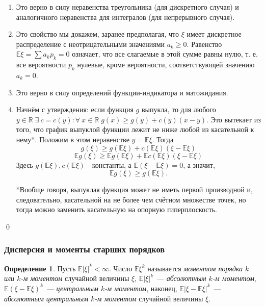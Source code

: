 \documentclass[oneside,final,14pt]{extreport}
\renewenvironment{proof}{{\bfseries Доказательство.}}{\qed}
\theoremstyle{plain}
\theoremstyle{definition}
\newtheorem*{defn}{Определение}
\theoremstyle{named}
\begin{document}
\begin{proof}
\begin{enumerate}
    \item Это верно в силу неравенства треугольника (для дискретного случая) и аналогичного неравенства для интегралов (для непрерывного случая).
    
    \item Это свойство мы докажем, заранее предполагая, что $\xi$ имеет дискретное распределение с неотрицательными значениями $a_k \geqslant 0$. Равенство $\mathbb{E}\xi = \sum a_k p_k = 0$ означает, что все слагаемые в этой сумме равны нулю, т. е. все вероятности $p_k$ нулевые, кроме вероятности, соответствующей значению $a_k = 0$.
    
    \item Это верно в силу определений функции-индикатора и матожидания.
    
    \item Начнём с утверждения: если функция $g$ выпукла, то для любого ${y \in \mathbb{R}} \; {\exists \: c = c(y) \colon} \forall \: x \in \mathbb{R} \; g(x) \geqslant g(y) + c(y)(x - y)$. Это вытекает из того, что график выпуклой функции лежит не ниже любой из касательной к нему*. Положим в этом неравенстве $y = \mathbb{E}\xi$. Тогда
    $$ g(\xi) \geqslant g(\mathbb{E}\xi) + c(\mathbb{E}\xi)(\xi - \mathbb{E}\xi) $$
    $$ \mathbb{E}g(\xi) \geqslant \mathbb{E}g(\mathbb{E}\xi) +  \mathbb{E}c(\mathbb{E}\xi)(\xi - \mathbb{E}\xi)$$
    Здесь $g(\mathbb{E}\xi), c(\mathbb{E}\xi)$ - константы, а $\mathbb{E}(\xi - \mathbb{E}\xi) = 0$, а значит,
    $$ \mathbb{E}g(\xi) \geqslant g(\mathbb{E}\xi).$$
    
    *Вообще говоря, выпуклая функция может не иметь первой производной и, следовательно, касательной на не более чем счётном множестве точек, но тогда можно заменить касательную на опорную гиперплоскость.
\end{enumerate}
\end{proof}

\subsubsection{Дисперсия и моменты старших порядков}

\begin{defn}
    Пусть ${\mathbb{E}|\xi|^k < \infty}$. Число ${\mathbb{E}\xi^k}$ называется {\it моментом порядка $k$ или $k$-м моментом} случайной величины $\xi$, ${\mathbb{E}|\xi|^k}$~--- {\it абсолютным $k$-м моментом}, ${\mathbb{E}(\xi - \mathbb{E}\xi)^k}$~--- {\it центральным $k$-м моментом}, наконец, ${\mathbb{E}|\xi - \mathbb{E}\xi|^k}$~--- {\it абсолютным центральным $k$-м моментом} случайной величины $\xi$.
\end{defn}
\end{document}
